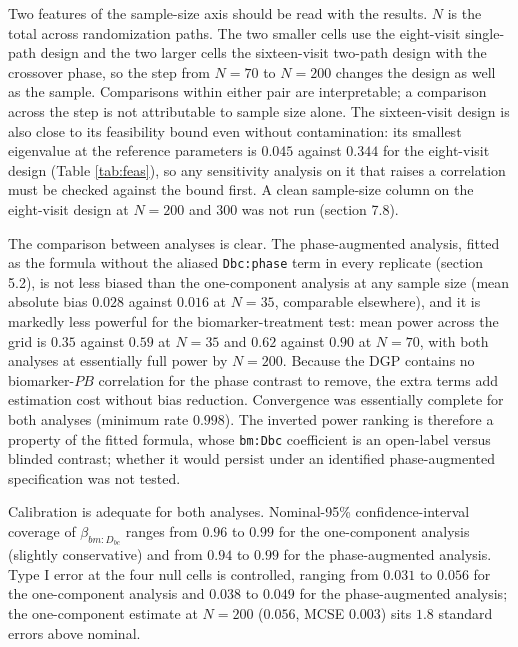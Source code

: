 \documentclass[
  11pt,
]{article}
\begin{document}
Two features of the sample-size axis should be read with the results.
\(N\) is the total across randomization paths. The two smaller cells use the
eight-visit single-path design and the two larger cells the sixteen-visit
two-path design with the crossover phase, so the step from \(N = 70\) to
\(N = 200\) changes the design as well as the sample. Comparisons within
either pair are interpretable; a comparison across the step is not
attributable to sample size alone. The sixteen-visit design is also close
to its feasibility bound even without contamination: its smallest
eigenvalue at the reference parameters is
\(0.045\) against
\(0.344\) for the eight-visit design
(Table \ref{tab:feas}), so any sensitivity analysis on it that raises a
correlation must be checked against the bound first. A clean sample-size
column on the eight-visit design at \(N = 200\) and \(300\) was not run
(section 7.8).

The comparison between analyses is clear. The phase-augmented analysis,
fitted as the formula without the aliased \texttt{Dbc:phase} term in
every replicate (section 5.2), is not less biased than the one-component
analysis at any sample size (mean absolute bias \(0.028\) against \(0.016\) at
\(N = 35\), comparable elsewhere), and it is markedly less powerful for the
biomarker-treatment test: mean power across the grid is \(0.35\) against
\(0.59\) at \(N = 35\) and \(0.62\) against \(0.90\) at \(N = 70\), with both
analyses at essentially full power by \(N = 200\). Because the DGP contains
no biomarker-\(PB\) correlation for the phase contrast to remove, the extra
terms add estimation cost without bias reduction. Convergence was
essentially complete for both analyses (minimum rate \(0.998\)). The
inverted power ranking is therefore a property of the fitted formula,
whose \texttt{bm:Dbc} coefficient is an open-label versus blinded
contrast; whether it would persist under an identified phase-augmented
specification was not tested.

Calibration is adequate for both analyses. Nominal-95\% confidence-interval
coverage of \(\beta_{bm:D_{bc}}\) ranges from \(0.96\) to \(0.99\) for the
one-component analysis (slightly conservative) and from \(0.94\) to \(0.99\)
for the phase-augmented analysis. Type I error at the four null cells is
controlled, ranging from \(0.031\) to \(0.056\) for the one-component analysis
and \(0.038\) to \(0.049\) for the phase-augmented analysis; the one-component
estimate at \(N = 200\) (\(0.056\), MCSE \(0.003\)) sits \(1.8\) standard errors
above nominal.
\end{document}
